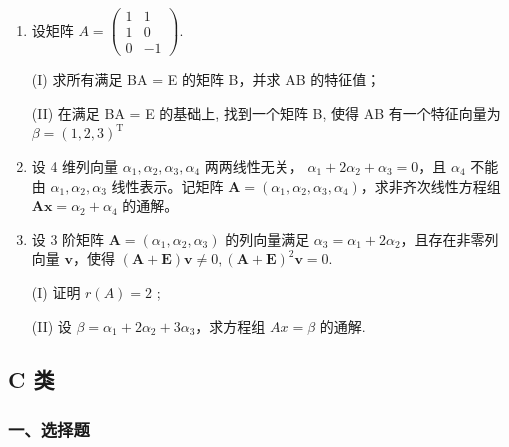 \documentclass[12pt, a4paper]{ctexart}
\begin{document}
\begin{enumerate}[start=14]
    \item 设矩阵 $ A = \begin{pmatrix} 1 & 1 \\ 1 & 0 \\ 0 & -1 \end{pmatrix} $.
    
    (I) 求所有满足 BA = E 的矩阵 B，并求 AB 的特征值；
    
    (II) 在满足 BA = E 的基础上, 找到一个矩阵 B, 使得 AB 有一个特征向量为 $ \beta = (1, 2, 3)^{\mathrm{T}} $

    \item 设 4 维列向量 $ \alpha_1, \alpha_2, \alpha_3, \alpha_4 $ 两两线性无关， $ \alpha_1 + 2\alpha_2 + \alpha_3 = 0 $，且 $ \alpha_4 $ 不能由 $ \alpha_1, \alpha_2, \alpha_3 $ 线性表示。记矩阵 $ \mathbf{A} = (\alpha_1, \alpha_2, \alpha_3, \alpha_4) $，求非齐次线性方程组 $ \mathbf{A}\mathbf{x} = \alpha_2 + \alpha_4 $ 的通解。

    \item 设 3 阶矩阵 $ \mathbf{A} = (\alpha_1, \alpha_2, \alpha_3) $ 的列向量满足 $ \alpha_3 = \alpha_1 + 2\alpha_2 $，且存在非零列向量 $ \mathbf{v} $，使得 $ (\mathbf{A} + \mathbf{E}) \mathbf{v} \neq 0, (\mathbf{A} + \mathbf{E})^2 \mathbf{v} = 0 $.
    
    (I) 证明 $ r(A)=2 $ ;
    
    (II) 设 $ \beta = \alpha_{1} + 2\alpha_{2} + 3\alpha_{3} $，求方程组 $ Ax = \beta $ 的通解.
\end{enumerate}

\subsection{C 类}

\subsubsection*{一、选择题}
\end{document}
